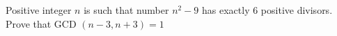 Positive integer $n$ is such that number $n^2-9$ has exactly $6$ positive divisors. Prove that GCD $(n-3, n+3)=1$